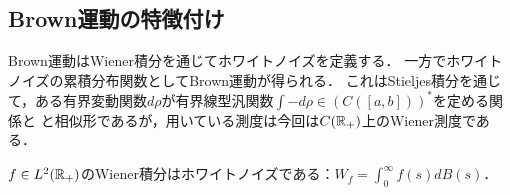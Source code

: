 \documentclass[uplatex,dvipdfmx]{jsreport}
\begin{document}
\subsection{Brown運動の特徴付け}

\begin{tcolorbox}[colframe=ForestGreen, colback=ForestGreen!10!white,breakable,colbacktitle=ForestGreen!40!white,coltitle=black,fonttitle=\bfseries\sffamily,
title=]
    Brown運動はWiener積分を通じてホワイトノイズを定義する．
    一方でホワイトノイズの累積分布関数としてBrown運動が得られる．
    これはStieljes積分を通じて，ある有界変動関数$d\rho$が有界線型汎関数$\int-d\rho\in (C([a,b]))^*$を定める関係と
    と相似形であるが，用いている測度は今回は$C(\mathbb{R}_+)$上のWiener測度である．
\end{tcolorbox}

\begin{proposition}
    $f\in L^2(\mathbb{R}_+)$のWiener積分はホワイトノイズである：$W_f=\int^\infty_0f(s)dB(s)$．
\end{proposition}
\end{document}
